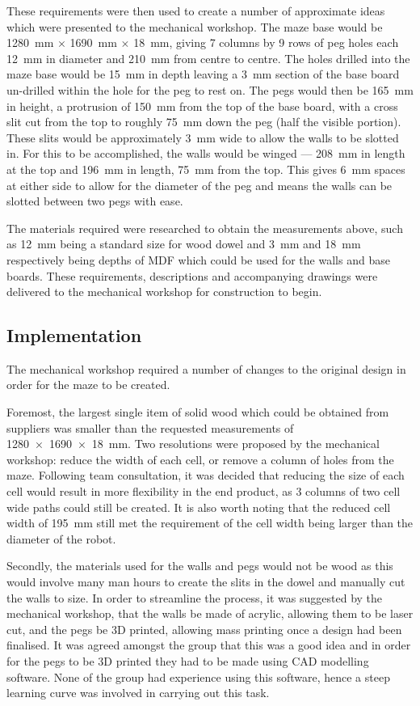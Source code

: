 These requirements were then used to create a number of approximate ideas which
were presented to the mechanical workshop. The maze base would be \SI{1280}{\mm}
$\times$ \SI{1690}{\mm} $\times$ \SI{18}{\mm}, giving 7 columns by 9 rows of
peg holes each \SI{12}{\mm} in diameter and \SI{210}{\mm} from centre to
centre. The holes drilled into the maze base would be \SI{15}{\mm} in depth
leaving a \SI{3}{\mm} section of the base board un-drilled within the hole for the peg to rest on. The pegs would then be
\SI{165}{\mm} in height, a protrusion of \SI{150}{\mm} from the top of the base board, with a cross slit cut from the top to
roughly \SI{75}{\mm} down the peg
(half the visible portion). These slits would be approximately \SI{3}{\mm} wide to allow the walls to be slotted in. For
this to be accomplished, the walls would be winged --- \SI{208}{\mm} in length at the top and \SI{196}{\mm} in length,
\SI{75}{\mm} from the top. This gives \SI{6}{\mm} spaces at either side to allow for the diameter of the peg and means the walls
can be slotted between two pegs with ease.

The materials required were researched to obtain the measurements
above, such as \SI{12}{\mm} being a standard size for wood dowel and \SI{3}{\mm}
and \SI{18}{\mm} respectively being depths of MDF which could be used for the
walls and base boards. These requirements, descriptions and accompanying
drawings were delivered to the mechanical workshop for construction to begin.

\subsection{Implementation}\label{test/maze/impl}
The mechanical workshop required a number of changes to the original design in
order for the maze to be created.

Foremost, the largest single item of solid wood which could be obtained from
suppliers was smaller than the requested measurements of \SI{1280 x 1690 x 18}
{\mm}. Two resolutions were proposed by the mechanical workshop: reduce
the width of each cell, or remove a column of holes from the maze. Following
team consultation, it was decided that reducing the size of each cell would
result in more flexibility in the end product, as 3 columns of two cell wide paths could still
be created. It is also worth noting that the reduced cell width of \SI{195}{\mm}
still met the requirement of the cell width being larger than the diameter of
the robot.

Secondly, the materials used for the walls and pegs would not be wood as this
would involve many man hours to create the slits in the dowel and
manually cut the walls to size. In order to streamline the process, it was
suggested by the mechanical workshop, that the walls be made of acrylic, allowing
them to be laser cut, and the pegs be 3D printed, allowing mass printing
once a design had been finalised. It was agreed amongst the group that this was a good idea and
in order for the pegs to be 3D printed they had to be made using CAD modelling
software. None of the group had experience using this software, hence
a steep learning curve was involved in carrying out this task.

